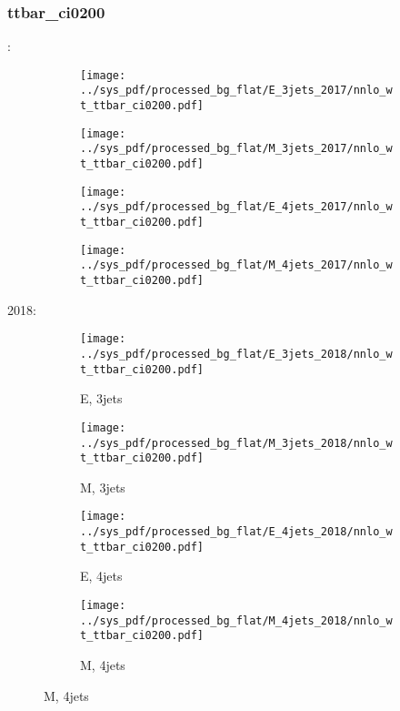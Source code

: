 \documentclass{beamer}
\begin{document}
\begin{frame}
\frametitle{ttbar_ci0200}
\fontsize{5}{1}:
\begin{figure}
\centering
\begin{subfigure}[b]{0.24\textwidth}
\texttt{[image: ../sys\_pdf/processed\_bg\_flat/E\_3jets\_2017/nnlo\_wt\_ttbar\_ci0200.pdf]}
\end{subfigure}
\begin{subfigure}[b]{0.24\textwidth}
\texttt{[image: ../sys\_pdf/processed\_bg\_flat/M\_3jets\_2017/nnlo\_wt\_ttbar\_ci0200.pdf]}
\end{subfigure}
\begin{subfigure}[b]{0.24\textwidth}
\texttt{[image: ../sys\_pdf/processed\_bg\_flat/E\_4jets\_2017/nnlo\_wt\_ttbar\_ci0200.pdf]}
\end{subfigure}
\begin{subfigure}[b]{0.24\textwidth}
\texttt{[image: ../sys\_pdf/processed\_bg\_flat/M\_4jets\_2017/nnlo\_wt\_ttbar\_ci0200.pdf]}
\end{subfigure}
\end{figure}
2018:
\begin{figure}
\centering
\begin{subfigure}[b]{0.24\textwidth}
\texttt{[image: ../sys\_pdf/processed\_bg\_flat/E\_3jets\_2018/nnlo\_wt\_ttbar\_ci0200.pdf]}
\captionsetup{font=tiny}
\caption{E, 3jets}
\end{subfigure}
\begin{subfigure}[b]{0.24\textwidth}
\texttt{[image: ../sys\_pdf/processed\_bg\_flat/M\_3jets\_2018/nnlo\_wt\_ttbar\_ci0200.pdf]}
\captionsetup{font=tiny}
\caption{M, 3jets}
\end{subfigure}
\begin{subfigure}[b]{0.24\textwidth}
\texttt{[image: ../sys\_pdf/processed\_bg\_flat/E\_4jets\_2018/nnlo\_wt\_ttbar\_ci0200.pdf]}
\captionsetup{font=tiny}
\caption{E, 4jets}
\end{subfigure}
\begin{subfigure}[b]{0.24\textwidth}
\texttt{[image: ../sys\_pdf/processed\_bg\_flat/M\_4jets\_2018/nnlo\_wt\_ttbar\_ci0200.pdf]}
\captionsetup{font=tiny}
\caption{M, 4jets}
\end{subfigure}
\end{figure}
\end{frame}
\end{document}
